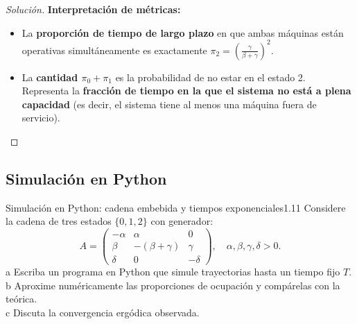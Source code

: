 \documentclass[10pt,a4paper]{article}
\begin{document}
\begin{proof}[Solución]
    \textbf{Interpretación de métricas:}
    \begin{itemize}
        \item La \textbf{proporción de tiempo de largo plazo} en que ambas máquinas están operativas simultáneamente es exactamente $\pi_2 = \left(\frac{\gamma}{\beta+\gamma}\right)^2$.
        \item La \textbf{cantidad $\pi_0 + \pi_1$} es la probabilidad de no estar en el estado 2. Representa la \textbf{fracción de tiempo en la que el sistema no está a plena capacidad} (es decir, el sistema tiene al menos una máquina fuera de servicio).
    \end{itemize}
\end{proof}

\newpage
\subsection{Simulación en Python}

\begin{ejercicio}{Simulación en Python: cadena embebida y tiempos exponenciales}{1.11}
    Considere la cadena de tres estados $\{0,1,2\}$ con generador:
    \[ A = \begin{pmatrix} -\alpha & \alpha & 0 \\ \beta & -(\beta+\gamma) & \gamma \\ \delta & 0 & -\delta \end{pmatrix}, \quad \alpha, \beta, \gamma, \delta > 0. \]
    a Escriba un programa en Python que simule trayectorias hasta un tiempo fijo $T$. \\
    b Aproxime numéricamente las proporciones de ocupación y compárelas con la teórica. \\
    c Discuta la convergencia ergódica observada.
\end{ejercicio}

\vspace{5mm}
\end{document}
